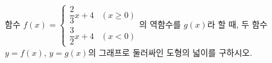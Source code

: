함수 $f(x)=\begin{cases} \dfrac{2}{3}x+4 & (x\ge 0) \\[1.5mm] \dfrac{3}{2}x+4 & (x<0) \end{cases}$의 역함수를 $g(x)$라 할 때, 두 함수 $y=f(x)$, $y=g(x)$의 그래프로 둘러싸인 도형의 넓이를 구하시오.
